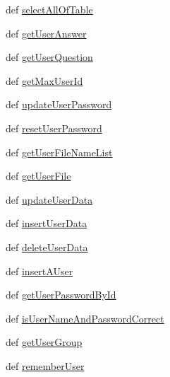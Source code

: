 \begin{DoxyCompactItemize}
\item 
def \hyperlink{classweb_1_1database_1_1_sqlite_database_a59c2f0066ddcba177323be526314c9da}{select\-All\-Of\-Table}
\item 
def \hyperlink{classweb_1_1database_1_1_sqlite_database_af1a50470e43bc733dd685aada07e3617}{get\-User\-Answer}
\item 
def \hyperlink{classweb_1_1database_1_1_sqlite_database_af4e44375ecc4008b039313fb7c341821}{get\-User\-Question}
\item 
def \hyperlink{classweb_1_1database_1_1_sqlite_database_aa62f2c3a69e55372b9a66ed332f58e9d}{get\-Max\-User\-Id}
\item 
def \hyperlink{classweb_1_1database_1_1_sqlite_database_a1b89378d2c5141202b86026d9e9b3738}{update\-User\-Password}
\item 
def \hyperlink{classweb_1_1database_1_1_sqlite_database_ad582b58beb1e6885b24d5c518ed3e436}{reset\-User\-Password}
\item 
def \hyperlink{classweb_1_1database_1_1_sqlite_database_ae235843baa6fead6fdb7f303c4de55ad}{get\-User\-File\-Name\-List}
\item 
def \hyperlink{classweb_1_1database_1_1_sqlite_database_af02720856f577729f2770602fb30c5d6}{get\-User\-File}
\item 
def \hyperlink{classweb_1_1database_1_1_sqlite_database_a061db60fe272d6d9ee3a5d4eecbe0937}{update\-User\-Data}
\item 
def \hyperlink{classweb_1_1database_1_1_sqlite_database_a4838ce43eed7fc1ef470316c6e0f81c2}{insert\-User\-Data}
\item 
def \hyperlink{classweb_1_1database_1_1_sqlite_database_a599f04479dffcc7902db402e48529848}{delete\-User\-Data}
\item 
def \hyperlink{classweb_1_1database_1_1_sqlite_database_ae42c9a5dee3bff132e5f8f2458e8ac48}{insert\-A\-User}
\item 
def \hyperlink{classweb_1_1database_1_1_sqlite_database_a24a81afb2a52bfd4d44ed5d7f864f74c}{get\-User\-Password\-By\-Id}
\item 
def \hyperlink{classweb_1_1database_1_1_sqlite_database_ab34aa657485cc920ea156d9e7bb913a8}{is\-User\-Name\-And\-Password\-Correct}
\item 
def \hyperlink{classweb_1_1database_1_1_sqlite_database_ac9dddfa269a4ea8777ff824594b4bebc}{get\-User\-Group}
\item 
def \hyperlink{classweb_1_1database_1_1_sqlite_database_a727f95db54db2006a3be8b078e5df8d9}{remember\-User}
\item 

\end{DoxyCompactItemize}
